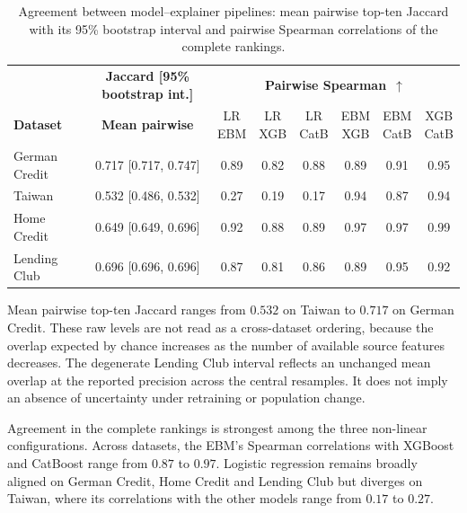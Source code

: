 \begin{table}[htbp]
\centering
\fontsize{8.5pt}{10pt}\selectfont
\setlength{\tabcolsep}{3pt}
\begin{tabular}{@{}lccccccc@{}}
\toprule
 & \textbf{Jaccard [95\% bootstrap int.]} & \multicolumn{6}{c}{\textbf{Pairwise Spearman}~$\uparrow$} \\
\cmidrule(lr){2-2}\cmidrule(lr){3-8}
\textbf{Dataset} & \textbf{Mean pairwise} & \shortstack{LR\\EBM} & \shortstack{LR\\XGB} & \shortstack{LR\\CatB} & \shortstack{EBM\\XGB} & \shortstack{EBM\\CatB} & \shortstack{XGB\\CatB} \\
\midrule
German Credit & 0.717 [0.717, 0.747] & 0.89 & 0.82 & 0.88 & 0.89 & 0.91 & 0.95 \\
Taiwan        & 0.532 [0.486, 0.532] & 0.27 & 0.19 & 0.17 & 0.94 & 0.87 & 0.94 \\
Home Credit   & 0.649 [0.649, 0.696] & 0.92 & 0.88 & 0.89 & 0.97 & 0.97 & 0.99 \\
Lending Club  & 0.696 [0.696, 0.696] & 0.87 & 0.81 & 0.86 & 0.89 & 0.95 & 0.92 \\
\bottomrule
\end{tabular}
\caption[Cross-model agreement on which features matter]{Agreement between
model--explainer pipelines: mean pairwise top-ten Jaccard with its 95\% bootstrap
interval and pairwise Spearman correlations of the complete rankings.}
\label{tab:cross_model_agreement}
\end{table}

Mean pairwise top-ten Jaccard ranges from $0.532$ on Taiwan to $0.717$ on German Credit.
These raw levels are not read as a cross-dataset ordering, because the overlap expected
by chance increases as the number of available source features decreases. The degenerate
Lending Club interval reflects an unchanged mean overlap at the reported precision across
the central resamples. It does not imply an absence of uncertainty under retraining or
population change.

Agreement in the complete rankings is strongest among the three non-linear
configurations. Across datasets, the EBM's Spearman correlations with XGBoost and
CatBoost range from $0.87$ to $0.97$. Logistic regression remains broadly aligned on
German Credit, Home Credit and Lending Club but diverges on Taiwan, where its
correlations with the other models range from $0.17$ to $0.27$.

